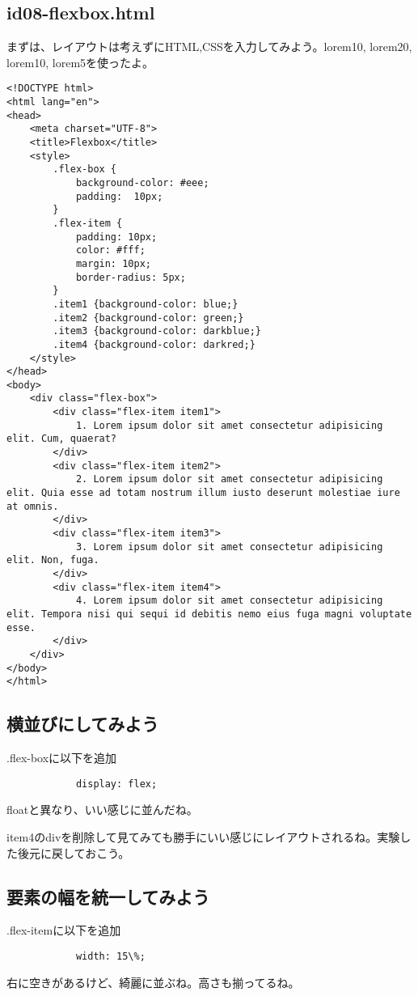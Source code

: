 \documentclass[mingoth,11pt,a4j,uplatex]{jsarticle}
\begin{document}
\subsection{id08-flexbox.html}
まずは、レイアウトは考えずにHTML,CSSを入力してみよう。lorem10, lorem20, lorem10, lorem5を使ったよ。
\begin{lstlisting}[caption=基本のHTML,CSS1]
<!DOCTYPE html>
<html lang="en">
<head>
    <meta charset="UTF-8">
    <title>Flexbox</title>
    <style>
        .flex-box {
            background-color: #eee;
            padding:  10px;
        }
        .flex-item {
            padding: 10px;
            color: #fff;
            margin: 10px;
            border-radius: 5px;
        }
        .item1 {background-color: blue;}
        .item2 {background-color: green;}
        .item3 {background-color: darkblue;}
        .item4 {background-color: darkred;}
    </style>
</head>
<body>
    <div class="flex-box">
        <div class="flex-item item1">
            1. Lorem ipsum dolor sit amet consectetur adipisicing elit. Cum, quaerat?
        </div>
        <div class="flex-item item2">
            2. Lorem ipsum dolor sit amet consectetur adipisicing elit. Quia esse ad totam nostrum illum iusto deserunt molestiae iure at omnis.
        </div>
        <div class="flex-item item3">
            3. Lorem ipsum dolor sit amet consectetur adipisicing elit. Non, fuga.
        </div>
        <div class="flex-item item4">
            4. Lorem ipsum dolor sit amet consectetur adipisicing elit. Tempora nisi qui sequi id debitis nemo eius fuga magni voluptate esse.
        </div>
    </div>
</body>
</html>
\end{lstlisting}

\subsection{横並びにしてみよう}
.flex-boxに以下を追加
\begin{lstlisting}
            display: flex;
\end{lstlisting}
floatと異なり、いい感じに並んだね。

item4のdivを削除して見てみても勝手にいい感じにレイアウトされるね。実験した後元に戻しておこう。

\subsection{要素の幅を統一してみよう}
.flex-itemに以下を追加
\begin{lstlisting}
            width: 15\%;
\end{lstlisting}
右に空きがあるけど、綺麗に並ぶね。高さも揃ってるね。
\end{document}
